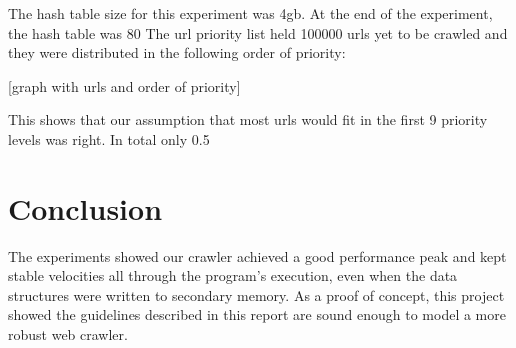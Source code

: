 \documentclass{acmart}
\begin{document}
The hash table size for this experiment was 4gb. At the end of the experiment, the hash table was 80%
The url priority list held 100000 urls yet to be crawled and they were distributed in the following order
of priority:

[graph with urls and order of priority]

This shows that our assumption that most urls would fit in the first 9 priority levels was right. In total
only 0.5%

\section{Conclusion}
The experiments showed our crawler achieved a good performance peak and kept stable velocities all through the
program's execution, even when the data structures were written to secondary memory. As a proof of concept,
this project showed the guidelines described in this report are sound enough to model a more robust web
crawler.
\end{document}

